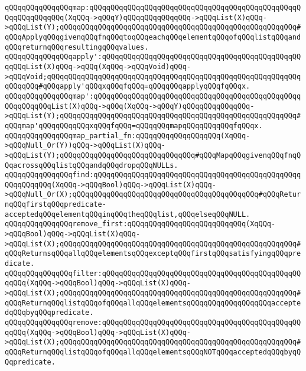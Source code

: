 \verb|qQQqqQQqqQQqqQQqmap:qQQqqQQqqQQqqQQqqQQqqQQqqQQqqQQqqQQqqQQqqQQqqQQqqQQqqQQqqQQqqQQq(XqQQq->qQQqY)qQQqqQQqqQQqqQQq->qQQqList(X)qQQq->qQQqList(Y);qQQqqQQqqQQqqQQqqQQqqQQqqQQqqQQqqQQqqQQqqQQqqQQqqQQqqQQq#qQQqApplyqQQqgivenqQQqfnqQQqtoqQQqeachqQQqelementqQQqofqQQqlistqQQqandqQQqreturnqQQqresultingqQQqvalues.|\newline
\newline
\verb|qQQqqQQqqQQqqQQqapply':qQQqqQQqqQQqqQQqqQQqqQQqqQQqqQQqqQQqqQQqqQQqqQQqqQQqList(X)qQQq->qQQq(XqQQq->qQQqVoid)qQQq->qQQqVoid;qQQqqQQqqQQqqQQqqQQqqQQqqQQqqQQqqQQqqQQqqQQqqQQqqQQqqQQqqQQqqQQqqQQq#qQQqapply'qQQqxqQQqfqQQq=qQQqqQQqapplyqQQqfqQQqx.|\newline
\verb|qQQqqQQqqQQqqQQqmap':qQQqqQQqqQQqqQQqqQQqqQQqqQQqqQQqqQQqqQQqqQQqqQQqqQQqqQQqqQQqList(X)qQQq->qQQq(XqQQq->qQQqY)qQQqqQQqqQQqqQQq->qQQqList(Y);qQQqqQQqqQQqqQQqqQQqqQQqqQQqqQQqqQQqqQQqqQQqqQQqqQQqqQQq#qQQqmap'qQQqqQQqqQQqxqQQqfqQQq=qQQqqQQqmapqQQqqQQqqQQqfqQQqx.|\newline
\newline
\verb|qQQqqQQqqQQqqQQqmap_partial_fn:qQQqqQQqqQQqqQQqqQQq(XqQQq->qQQqNull_Or(Y))qQQq->qQQqList(X)qQQq->qQQqList(Y);qQQqqQQqqQQqqQQqqQQqqQQqqQQqqQQq#qQQqMapqQQqgivenqQQqfnqQQqacrossqQQqlistqQQqandqQQqdropqQQqNULLs.|\newline
\newline
\verb|qQQqqQQqqQQqqQQqfind:qQQqqQQqqQQqqQQqqQQqqQQqqQQqqQQqqQQqqQQqqQQqqQQqqQQqqQQqqQQq(XqQQq->qQQqBool)qQQq->qQQqList(X)qQQq->qQQqNull_Or(X);qQQqqQQqqQQqqQQqqQQqqQQqqQQqqQQqqQQqqQQqqQQq#qQQqReturnqQQqfirstqQQqpredicate-acceptedqQQqelementqQQqinqQQqtheqQQqlist,qQQqelseqQQqNULL.|\newline
\verb|qQQqqQQqqQQqqQQqremove_first:qQQqqQQqqQQqqQQqqQQqqQQqqQQq(XqQQq->qQQqBool)qQQq->qQQqList(X)qQQq->qQQqList(X);qQQqqQQqqQQqqQQqqQQqqQQqqQQqqQQqqQQqqQQqqQQqqQQqqQQqqQQq#qQQqReturnsqQQqallqQQqelementsqQQqexceptqQQqfirstqQQqsatisfyingqQQqpredicate.|\newline
\newline
\verb|qQQqqQQqqQQqqQQqfilter:qQQqqQQqqQQqqQQqqQQqqQQqqQQqqQQqqQQqqQQqqQQqqQQqqQQq(XqQQq->qQQqBool)qQQq->qQQqList(X)qQQq->qQQqList(X);qQQqqQQqqQQqqQQqqQQqqQQqqQQqqQQqqQQqqQQqqQQqqQQqqQQqqQQq#qQQqReturnqQQqlistqQQqofqQQqallqQQqelementsqQQqqQQqqQQqqQQqqQQqacceptedqQQqbyqQQqpredicate.|\newline
\verb|qQQqqQQqqQQqqQQqremove:qQQqqQQqqQQqqQQqqQQqqQQqqQQqqQQqqQQqqQQqqQQqqQQqqQQq(XqQQq->qQQqBool)qQQq->qQQqList(X)qQQq->qQQqList(X);qQQqqQQqqQQqqQQqqQQqqQQqqQQqqQQqqQQqqQQqqQQqqQQqqQQqqQQq#qQQqReturnqQQqlistqQQqofqQQqallqQQqelementsqQQqNOTqQQqacceptedqQQqbyqQQqpredicate.|\newline
